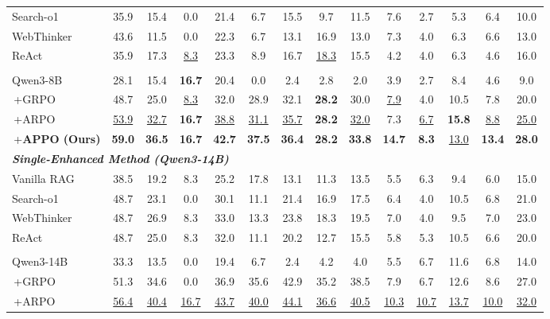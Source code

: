 \documentclass{article}
\begin{document}
\begin{table}[t]
{\begin{tabular}{lccccccccccccc}
Search-o1 & 35.9 & 15.4 & 0.0 & 21.4 & 6.7 & 15.5 & 9.7 & 11.5 & 7.6 & 2.7 & 5.3 & 6.4 & 10.0   \\
WebThinker & 43.6 & 11.5 & 0.0 & 22.3 & 6.7 & 13.1 & 16.9 & 13.0 & 7.3 & 4.0 & 6.3 & 6.6 & 13.0   \\
ReAct & 35.9 & 17.3 & \underline{8.3} & 23.3 & 8.9 & 16.7 & \underline{18.3} & 15.5 & 4.2 & 4.0 & 6.3 & 4.6 &  16.0   \\ \hdashline
\multicolumn{14}{l}{\textbf{\textit{RL-based Method (Qwen3-8B)}}} \\ 
Qwen3-8B & 28.1 & 15.4 & \textbf{16.7} & 20.4 & 0.0 & 2.4 & 2.8 & 2.0 & 3.9 & 2.7 & 8.4 & 4.6 & 9.0   \\
\,+GRPO &  {48.7} &  {25.0} & \underline{8.3} & 32.0 & 28.9 & 32.1 & \textbf{28.2} & 30.0 & \underline{7.9} & 4.0 & 10.5 & 7.8 & 20.0   \\
\,+ARPO & \underline{53.9} & \underline{32.7} & \textbf{16.7} & \underline{38.8} & \underline{31.1} & \underline{35.7} & \textbf{28.2} & \underline{32.0} & 7.3 & \underline{6.7} & \textbf{15.8} & \underline{8.8} & \underline{25.0}   \\ 
\rowcolor{gray!20}
\,+\textbf{APPO (Ours)} & \textbf{59.0} & \textbf{36.5} & \textbf{16.7} & \textbf{42.7} & \textbf{37.5}  & \textbf{36.4} & \textbf{28.2} & \textbf{33.8} &\textbf{14.7} & \textbf{8.3 }&\underline{13.0}  &\textbf{13.4}  & \textbf{28.0}  \\ \hline
\multicolumn{14}{l}{\textbf{\textit{Single-Enhanced Method (Qwen3-14B)}}} \\ 
Vanilla RAG & 38.5 & 19.2 & 8.3 & 25.2 & 17.8 & 13.1 & 11.3 & 13.5 & 5.5 & 6.3 & 9.4 & 6.0 & 15.0   \\
Search-o1 & 48.7 & 23.1 & 0.0 & 30.1 & 11.1 & 21.4 & 16.9 & 17.5 & 6.4 & 4.0 & 10.5 & 6.8 & 21.0   \\
WebThinker & 48.7 & 26.9 & 8.3 & 33.0 & 13.3 & 23.8 & 18.3 & 19.5 & 7.0 & 4.0 & 9.5 & 7.0 & 23.0   \\
ReAct & 48.7 & 25.0 & 8.3 & 32.0 & 11.1 & 20.2 & 12.7 & 15.5 & 5.8 & 5.3 & 10.5 & 6.6 & 20.0  \\ \hdashline
\multicolumn{14}{l}{\textbf{\textit{RL-based Method (Qwen3-14B)}}} \\ 
Qwen3-14B & 33.3 & 13.5 & 0.0 & 19.4 & 6.7 & 2.4 & 4.2 & 4.0 & 5.5 & 6.7 & 11.6 & 6.8 & 14.0  \\
\,+GRPO & 51.3 & 34.6 & 0.0 & 36.9 & 35.6 & 42.9 & 35.2 & 38.5 & 7.9 & 6.7 & 12.6 & 8.6 & 27.0   \\
\,+ARPO & \underline{56.4} & \underline{40.4} & \underline{16.7} & \underline{43.7} & \underline{40.0} & \underline{44.1} & \underline{36.6} & \underline{40.5} & \underline{10.3} & \underline{10.7} & \underline{13.7} & \underline{10.0} & \underline{32.0}   \\ 

\end{tabular}}
\end{table}
\end{document}
